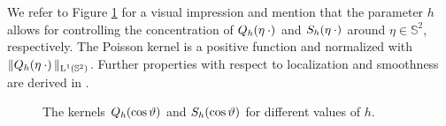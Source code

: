 \documentclass[11pt,a4paper,twoside,bibtotoc]{scrartcl}
\theoremstyle{plain}
\theoremstyle{definition}
\theoremstyle{remark}
\newcommand{\twosphere}{\ensuremath{\mathbb{S}^2}}
\newcommand{\Ln}[2]{\ensuremath{\text{\rm{L}}^{#1}\left(#2\right)}}
\newcommand{\fun}[2]{\ensuremath{#1{\hspace{-0.4ex}}\left(#2\right)}}
\newcommand{\mb}[1]{\mathbf{#1}}
\newcommand{\V}[1]{\mb{#1}}
\numberwithin{equation}{section}
\numberwithin{table}{section}
\numberwithin{figure}{section}
\begin{document}
We refer to Figure \ref{Basics:Figure:PoissonSingularityKernel} for a visual
impression and mention that the parameter $h$ allows for controlling the
concentration of $\fun{Q_{h}}{\V{\eta} \: \cdot}$ and $\fun{S_{h}}{\V{\eta} \:
  \cdot}$ around $\eta \in \twosphere$, respectively.
The Poisson kernel is a positive function and normalized with
$\|\fun{Q_{h}}{\V{\eta} \: \cdot}\|_{\Ln{1}{\twosphere}}$.
Further properties with respect to localization and smoothness are derived
in \cite[pp. 112]{frgesc}.

\begin{figure}[tb]
  \centering
  \hfill
  \caption{The kernels $\fun{Q_{h}}{\cos\vartheta}$ and $\fun{S_{h}}{\cos\vartheta}$
  for different values of $h$.}
  \label{Basics:Figure:PoissonSingularityKernel}
\end{figure}
\end{document}
